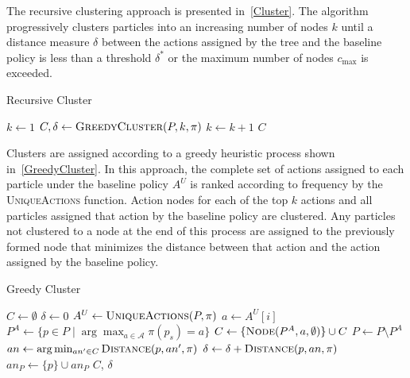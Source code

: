 \documentclass[letterpaper]{article} %
\begin{document}
The recursive clustering approach is presented in~\cref{Cluster}.
The algorithm progressively clusters particles into an increasing number of nodes $k$ until a distance measure $\delta$ between the actions assigned by the tree and the baseline policy is less than a threshold $\delta^*$ or the maximum number of nodes $c_{\max}$ is exceeded. 
\begin{algorithm}[ht]
\caption{Recursive Cluster}\label{Cluster}
\begin{algorithmic}[1]
        \State $k \gets 1$
        \Repeat
            \State $C, \delta \gets \textsc{GreedyCluster}(P, k, \pi)$
            \State $k \gets k + 1$
        \State \Return $C$
    \EndProcedure
\end{algorithmic}
\end{algorithm}

Clusters are assigned according to a greedy heuristic process shown in~\cref{GreedyCluster}.
In this approach, the complete set of actions assigned to each particle under the baseline policy $A^U$ is ranked according to frequency by the \textsc{UniqueActions} function. 
Action nodes for each of the top $k$ actions and all particles assigned that action by the baseline policy are clustered. 
Any particles not clustered to a node at the end of this process are assigned to the previously formed node that minimizes the distance between that action and the action assigned by the baseline policy. 
\begin{algorithm}[ht]
\caption{Greedy Cluster}\label{GreedyCluster}
\begin{algorithmic}[1]
        \State $C \gets \emptyset$
        \State $\delta \gets 0$
        \State $A^U \gets \textsc{UniqueActions}(P, \pi)$
            \State $a \gets A^U[i]$
            \State $P^A \gets \{ p \in P \mid \arg\max_{a \in \mathcal{A}}\pi(p_s) = a \}$
            \State $C \gets \{ \textsc{Node}(P^A, a, \emptyset) \} \cup C$
            \State $P \gets P \setminus P^A$
        \EndFor
            \State $an \gets \arg\min_{an' \in C} \textsc{Distance}(p, an', \pi)$
            \State $\delta \gets \delta + \textsc{Distance}(p, an, \pi)$
            \State $an_P \gets \{ p \} \cup an_P$
        \EndFor
        \State \Return $C$, $\delta$
    \EndProcedure
\end{algorithmic}
\end{algorithm}
\end{document}
